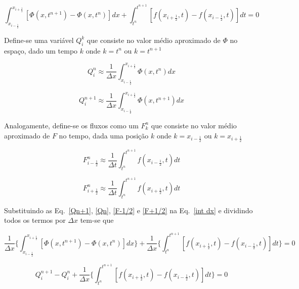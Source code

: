 \begin{equation}\label{int dx}
    \int_{x_{i-\frac{1}{2}}}^{x_{i+\frac{1}{2}}}[\Phi(x,t^{n+1}) -
    \Phi(x,t^n)]dx
    +
    \int_{t^n}^{t^{n+1}} [f(x_{i+\frac{1}{2}},t) - f(x_{i-\frac{1}{2}},t)]dt
    = 0
\end{equation}

\noindent Define-se uma variável $Q_i^k$ que consiste no valor médio aproximado
de $\Phi$ no espaço, dado um tempo $k$ onde $k = t^n$ ou $k = t^{n+1}$

\begin{equation}\label{Qn+1}
    Q_i^n \approx \frac{1}{\Delta x}
    \int_{x_{i-\frac{1}{2}}}^{x_{i+\frac{1}{2}}} \Phi(x,t^n)dx
\end{equation}

\begin{equation}\label{Qn}
    Q_i^{n+1} \approx \frac{1}{\Delta x}
    \int_{x_{i-\frac{1}{2}}}^{x_{i+\frac{1}{2}}} \Phi(x,t^{n+1})dx
\end{equation}

\noindent Analogamente, define-se os fluxos como um $F_k^n$ que consiste no
valor médio aproximado de $F$ no tempo, dada uma posição $k$ onde $k =
x_{i-\frac{1}{2}}$ ou $k = x_{i+\frac{1}{2}}$

\begin{equation}\label{F-1/2}
    F_{i-\frac{1}{2}}^n \approx \frac{1}{\Delta t}
    \int_{t^n}^{t^{n+1}} f(x_{i-\frac{1}{2}},t)dt
\end{equation}

\begin{equation}\label{F+1/2}
    F_{i+\frac{1}{2}}^n \approx \frac{1}{\Delta t}
    \int_{t^n}^{t^{n+1}} f(x_{i+\frac{1}{2}},t)dt
\end{equation}

\noindent Substituindo as Eq.\ \ref{Qn+1}, \ref{Qn}, \ref{F-1/2} e \ref{F+1/2}
na Eq.\ \ref{int dx} e dividindo todos os termos por $\Delta x$ tem-se que

\begin{equation*}
    \frac{1}{\Delta x} \Bigg\{
    \int_{x_{i-\frac{1}{2}}}^{x_{i+\frac{1}{2}}}[\Phi(x,t^{n+1}) -
    \Phi(x,t^n)]dx
    \Bigg\}
    +
    \frac{1}{\Delta x} \Bigg\{
    \int_{t^n}^{t^{n+1}} [f(x_{i+\frac{1}{2}},t) - f(x_{i-\frac{1}{2}},t)]dt
    \Bigg\}
    = 0
\end{equation*}

\begin{equation*}
    Q_i^{n+1} - Q_i^n + \frac{1}{\Delta x} \Bigg\{
    \int_{t^n}^{t^{n+1}} [f(x_{i+\frac{1}{2}},t) - f(x_{i-\frac{1}{2}},t)]dt
    \Bigg\}
    = 0
\end{equation*}

